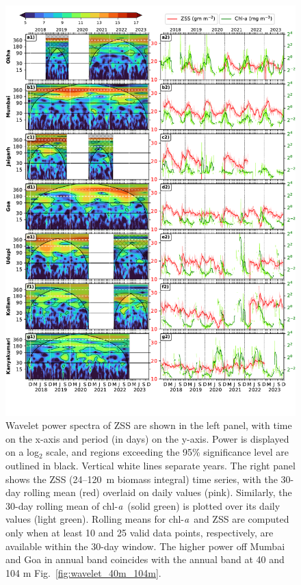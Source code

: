\documentclass[authoryear,review,11pt]{elsarticle}
\newcommand{\chla}{chl-{\emph{a}}}
\begin{document}
\begin{figure}[htbp]
	\centering
	\includegraphics[width=\textwidth]{./figures/wavelet_ss_chl_time_series.pdf} 
	\captionsetup{justification=justified,font=footnotesize,skip=0.05\baselineskip,width=\textwidth}
	\caption{Wavelet power spectra of ZSS are shown in the left panel, with time on the x-axis and period (in days) on the y-axis. Power is displayed on a log$_2$ scale, and regions exceeding the 95\% significance level are outlined in black. Vertical white lines separate years. The right panel shows the ZSS (24--120~m biomass integral) time series, with the 30-day rolling mean (red) overlaid on daily values (pink). Similarly, the 30-day rolling mean of \chla\ (solid green) is plotted over its daily values (light green). Rolling means for \chla\ and ZSS are computed only when at least 10 and 25 valid data points, respectively, are available within the 30-day window. The higher power off Mumbai and Goa in annual band coincides with the annual band at 40 and 104 m Fig.~\ref{fig:wavelet_40m_104m}.}
	\label{fig:wavelet_ss_chl_time_series}
\end{figure}
\end{document}
